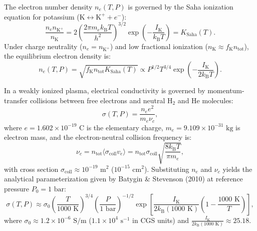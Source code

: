 \documentclass[11pt,a4paper]{article}
\begin{document}
The electron number density $n_e(T, P)$ is governed by the Saha ionization equation for potassium ($\text{K} \leftrightarrow \text{K}^+ + e^-$):
\begin{equation}
\frac{n_e n_{\mathrm{K}^+}}{n_{\mathrm{K}}} = 2 \left( \frac{2 \pi m_e k_{\mathrm{B}} T}{h^2} \right)^{3/2} \exp\left( -\frac{I_{\mathrm{K}}}{k_{\mathrm{B}} T} \right) = K_{\mathrm{Saha}}(T).
\label{eq:saha}
\end{equation}
Under charge neutrality ($n_e = n_{\mathrm{K}^+}$) and low fractional ionization ($n_{\mathrm{K}} \approx f_{\mathrm{K}} n_{\mathrm{tot}}$), the equilibrium electron density is:
\begin{equation}
n_e(T, P) = \sqrt{f_{\mathrm{K}} n_{\mathrm{tot}} K_{\mathrm{Saha}}(T)} \propto P^{1/2} T^{3/4} \exp\left( -\frac{I_{\mathrm{K}}}{2 k_{\mathrm{B}} T} \right).
\end{equation}

In a weakly ionized plasma, electrical conductivity is governed by momentum-transfer collisions between free electrons and neutral $\mathrm{H}_2$ and $\mathrm{He}$ molecules:
\begin{equation}
\sigma(T, P) = \frac{n_e e^2}{m_e \nu_c},
\label{eq:sigma_def}
\end{equation}
where $e = 1.602 \times 10^{-19}\text{ C}$ is the elementary charge, $m_e = 9.109 \times 10^{-31}\text{ kg}$ is electron mass, and the electron-neutral collision frequency is:
\begin{equation}
\nu_c = n_{\mathrm{tot}} \langle \sigma_{\mathrm{coll}} v_e \rangle = n_{\mathrm{tot}} \sigma_{\mathrm{coll}} \sqrt{\frac{8 k_{\mathrm{B}} T}{\pi m_e}},
\end{equation}
with cross section $\sigma_{\mathrm{coll}} \approx 10^{-19}\text{ m}^2$ ($10^{-15}\text{ cm}^2$). Substituting $n_e$ and $\nu_c$ yields the analytical parameterization given by Batygin \& Stevenson (2010) at reference pressure $P_0 = 1\text{ bar}$:
\begin{equation}
\sigma(T, P) \approx \sigma_0 \left( \frac{T}{1000\text{ K}} \right)^{3/4} \left( \frac{P}{1\text{ bar}} \right)^{-1/2} \exp\left[ \frac{I_{\mathrm{K}}}{2 k_{\mathrm{B}} (1000\text{ K})} \left( 1 - \frac{1000\text{ K}}{T} \right) \right],
\label{eq:sigma_bs}
\end{equation}
where $\sigma_0 \approx 1.2 \times 10^{-6}\text{ S/m}$ ($1.1 \times 10^4\text{ s}^{-1}$ in CGS units) and $\frac{I_{\mathrm{K}}}{2 k_{\mathrm{B}} (1000\text{ K})} \approx 25.18$.
\end{document}
